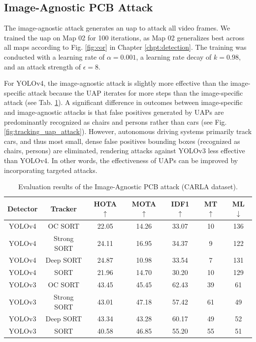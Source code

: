 \subsection{Image-Agnostic PCB Attack}

The image-agnostic attack generates an \acrfull{uap} to attack all video frames. We trained the \acrshort{uap} on Map 02 for 100 iterations, as Map 02 generalizes best across all maps according to Fig. \ref{fig:cor} in Chapter \ref{chpt:detection}. The training was conducted with a learning rate of $\alpha=0.001$, a learning rate decay of $k=0.98$, and an attack strength of $\epsilon=8$.

For YOLOv4, the image-agnostic attack is slightly more effective than the image-specific attack because the UAP iterates for more steps than the image-specific attack (see Tab. \ref{tab.carla_uap}). A significant difference in outcomes between image-specific and image-agnostic attacks is that false positives generated by UAPs are predominantly recognized as chairs and persons rather than cars (see Fig. \ref{fig:tracking_uap_attack}). However, autonomous driving systems primarily track cars, and thus most small, dense false positives bounding boxes (recognized as chairs, persons) are eliminated, rendering attacks against YOLOv3 less effective than YOLOv4. In other words, the effectiveness of UAPs can be improved by incorporating targeted attacks.

\begin{table}[H]
\centering
\begin{tabular}{ ccccccc } 
\hline
Detector & Tracker & HOTA $\uparrow$ & MOTA $\uparrow$ & IDF1 $\uparrow$ & MT $\uparrow$ & ML $\downarrow$ \\
\hline
YOLOv4 & OC SORT      &  22.05  &  14.26  &  33.07  &  10  &  136  \\
YOLOv4 & Strong SORT  &  24.11  &  16.95  &  34.37  &  9  &  122  \\ 
YOLOv4 & Deep SORT    &  24.87  &  10.98  &  33.54  &  7   &  131  \\ 
YOLOv4 & SORT         &  21.96  &  14.70  &  30.20  &  10   &  129  \\ 
\hline
YOLOv3 & OC SORT      &  43.45  &  45.45  &  62.43  &  39  &  61  \\
YOLOv3 & Strong SORT  &  43.01  &  47.18  &  57.42  &  61  &  49  \\ 
YOLOv3 & Deep SORT    &  43.34  &  43.28  &  60.17  &  49  &  52  \\ 
YOLOv3 & SORT         &  40.58  &  46.85  &  55.20  &  55  &  51  \\ 
\hline
\end{tabular}
\caption{Evaluation results of the Image-Agnostic PCB attack (CARLA dataset).}
\label{tab.carla_uap}
\end{table}

